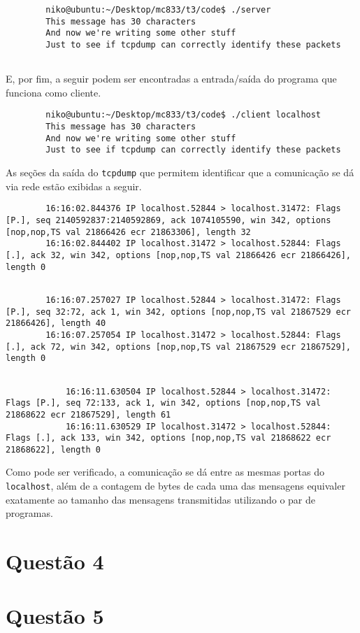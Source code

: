 \documentclass[a4paper,10pt]{article}
\begin{document}
    \begin{lstlisting}
        niko@ubuntu:~/Desktop/mc833/t3/code$ ./server
        This message has 30 characters
        And now we're writing some other stuff
        Just to see if tcpdump can correctly identify these packets
    
    \end{lstlisting}
    
    E, por fim, a seguir podem ser encontradas a entrada/saída do programa que funciona como cliente.
    
    \begin{lstlisting}
        niko@ubuntu:~/Desktop/mc833/t3/code$ ./client localhost
        This message has 30 characters
        And now we're writing some other stuff
        Just to see if tcpdump can correctly identify these packets

    \end{lstlisting}

    As seções da saída do {\tt tcpdump} que permitem identificar que a comunicação se dá via rede estão exibidas a seguir.
    
    \begin{lstlisting}
        16:16:02.844376 IP localhost.52844 > localhost.31472: Flags [P.], seq 2140592837:2140592869, ack 1074105590, win 342, options [nop,nop,TS val 21866426 ecr 21863306], length 32
        16:16:02.844402 IP localhost.31472 > localhost.52844: Flags [.], ack 32, win 342, options [nop,nop,TS val 21866426 ecr 21866426], length 0
        
    \end{lstlisting}

    \begin{lstlisting}
        16:16:07.257027 IP localhost.52844 > localhost.31472: Flags [P.], seq 32:72, ack 1, win 342, options [nop,nop,TS val 21867529 ecr 21866426], length 40
        16:16:07.257054 IP localhost.31472 > localhost.52844: Flags [.], ack 72, win 342, options [nop,nop,TS val 21867529 ecr 21867529], length 0
    
    \end{lstlisting}
    
    \begin{lstlisting}
            16:16:11.630504 IP localhost.52844 > localhost.31472: Flags [P.], seq 72:133, ack 1, win 342, options [nop,nop,TS val 21868622 ecr 21867529], length 61
            16:16:11.630529 IP localhost.31472 > localhost.52844: Flags [.], ack 133, win 342, options [nop,nop,TS val 21868622 ecr 21868622], length 0
    \end{lstlisting}

    Como pode ser verificado, a comunicação se dá entre as mesmas portas do {\tt localhost}, além de a contagem de bytes de cada uma das mensagens equivaler exatamente ao tamanho das mensagens transmitidas utilizando o par de programas.

\section{Questão 4}

\section{Questão 5}
\end{document}
